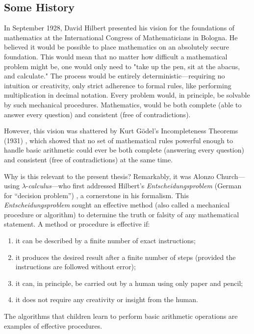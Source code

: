 \subsection*{Some History}

In September 1928, David Hilbert presented his vision for the foundations of mathematics at the International Congress of Mathematicians in Bologna. He believed it would be possible to place mathematics on an absolutely secure foundation. This would mean that no matter how difficult a mathematical problem might be, one would only need to "take up the pen, sit at the abacus, and calculate." The process would be entirely deterministic—requiring no intuition or creativity, only strict adherence to formal rules, like performing multiplication in decimal notation. Every problem would, in principle, be solvable by such mechanical procedures. Mathematics, would be both complete (able to answer every question) and consistent (free of contradictions). 

However, this vision was shattered by Kurt Gödel’s Incompleteness Theorems (1931) \cite{Godel}, which showed that no set of mathematical rules powerful enough to handle basic arithmetic could ever be both complete (answering every question) and consistent (free of contradictions) at the same time.


Why is this relevant to the present thesis? Remarkably, it was Alonzo Church—using $\lambda$-\textit{calculus}—who first addressed Hilbert’s \emph{Entscheidungsproblem} (German for ``decision problem'') \cite{hilbert1938}, a cornerstone in his formalism. This \emph{Entscheidungsproblem} sought an effective method (also called a mechanical procedure or algorithm) to determine the truth or falsity of any mathematical statement. A method or procedure is effective if:
\begin{enumerate}
    \item it can be described by a finite number of exact instructions;
    \item it produces the desired result after a finite number of steps (provided the instructions are followed without error);
    \item it can, in principle, be carried out by a human using only paper and pencil;
    \item it does not require any creativity or insight from the human.
\end{enumerate}
The algorithms that children learn to perform basic arithmetic operations are examples of effective procedures.


